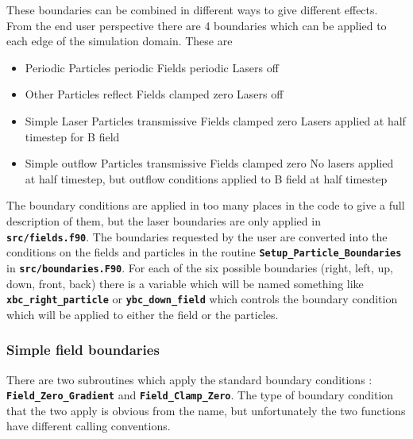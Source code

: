 \documentclass[12pt]{article}
\newcommand{\inlinecode}[1]{{\color{warwickred} \bf\texttt{#1}}}
\begin{document}
These boundaries can be combined in different ways to give different
effects. From the end user perspective there are 4 boundaries which can be
applied to each edge of the simulation domain. These are
\begin{itemize}
\item Periodic
  \subitem Particles periodic
  \subitem Fields periodic
  \subitem Lasers off
\item Other
  \subitem Particles reflect
  \subitem Fields clamped zero
  \subitem Lasers off
\item Simple Laser
  \subitem Particles transmissive
  \subitem Fields clamped zero
  \subitem Lasers applied at half timestep for B field
\item Simple outflow
  \subitem Particles transmissive
  \subitem Fields clamped zero
  \subitem No lasers applied at half timestep, but outflow conditions applied
  to B field at half timestep
\end{itemize}
The boundary conditions are applied in too many places in the code to give a
full description of them, but the laser boundaries are only applied in
\inlinecode{src/fields.f90}. The boundaries requested by the user are converted
into the conditions on the fields and particles in the routine
\inlinecode{Setup\_Particle\_Boundaries} in
\inlinecode{src/boundaries.F90}. For each of the six possible boundaries
(right, left, up, down, front, back) there is a variable which will be named
something like \inlinecode{xbc\_right\_particle} or
\inlinecode{ybc\_down\_field} which controls the boundary condition which will
be applied to either the field or the particles.

\subsubsection{Simple field boundaries}
There are two subroutines which apply the standard boundary conditions :
\inlinecode{Field\_Zero\_Gradient} and \inlinecode{Field\_Clamp\_Zero}. The
type of boundary condition that the two apply is obvious from the name, but
unfortunately the two functions have different calling conventions.
\end{document}
